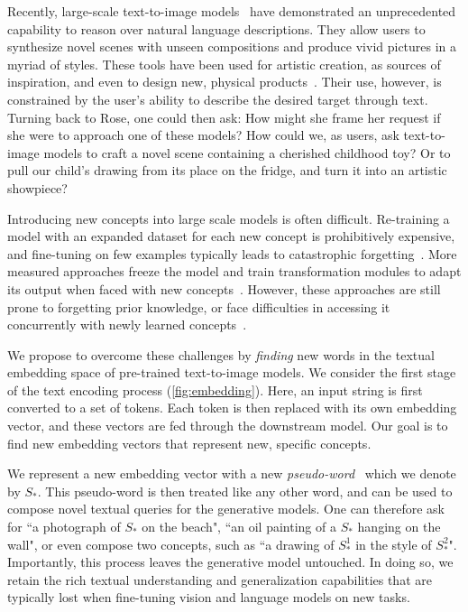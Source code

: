 Recently, large-scale text-to-image models~\citep{rombach2021highresolution,ramesh2021zero,ramesh2022hierarchical,nichol2021glide,yu2022scaling,saharia2022photorealistic} have demonstrated an unprecedented capability to reason over natural language descriptions. They allow users to synthesize novel scenes with unseen compositions and produce vivid pictures in a myriad of styles. These tools have been used for artistic creation, as sources of inspiration, and even to design new, physical products~\citep{yacoubian2022avocadobag}. Their use, however, is constrained by the user's ability to describe the desired target through text. Turning back to Rose, one could then ask: How might she frame her request if she were to approach one of these models? How could we, as users, ask text-to-image models to craft a novel scene containing a cherished childhood toy? Or to pull our child's drawing from its place on the fridge, and turn it into an artistic showpiece? 

Introducing new concepts into large scale models is often difficult. Re-training a model with an expanded dataset for each new concept is prohibitively expensive, and fine-tuning on few examples typically leads to catastrophic forgetting~\citep{ding2022don,Li2022}. More measured approaches freeze the model and train transformation modules to adapt its output when faced with new concepts~\citep{zhou2021learning,gao2021clip,skantze2022collie}. However, these approaches are still prone to forgetting prior knowledge, or face difficulties in accessing it concurrently with newly learned concepts~\citep{kumar2022fine,cohen2022my}.

We propose to overcome these challenges by \textit{finding} new words in the textual embedding space of pre-trained text-to-image models. We consider the first stage of the text encoding process (\ref{fig:embedding}). Here, an input string is first converted to a set of tokens. Each token is then replaced with its own embedding vector, and these vectors are fed through the downstream model. Our goal is to find new embedding vectors that represent new, specific concepts.

We represent a new embedding vector with a new \textit{pseudo-word}~\citep{rathvon2004early} 
which we denote by $S_*$. This pseudo-word is then treated like any other word, and can be used to compose novel textual queries for the generative models. One can therefore ask for ``a photograph of $S_*$ on the beach", ``an oil painting of a $S_*$ hanging on the wall", or even compose two concepts, such as ``a drawing of $S^1_*$ in the style of $S^2_*$". Importantly, this process leaves the generative model untouched. In doing so, we retain the rich textual understanding and generalization capabilities that are typically lost when fine-tuning vision and language models on new tasks.

